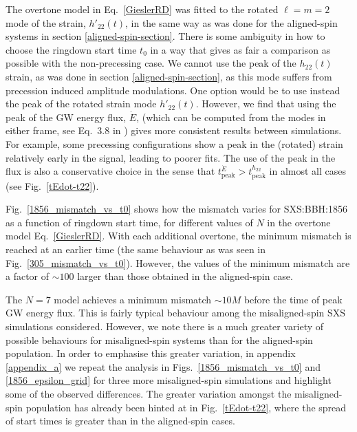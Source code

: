The overtone model in Eq.~\ref{GieslerRD} was fitted to the rotated $\ell=m=2$ mode of the strain, $h'_{22}(t)$, in the same way as was done for the aligned-spin systems in section \ref{aligned-spin-section}.
There is some ambiguity in how to choose the ringdown start time $t_0$ in a way that gives as fair a comparison as possible with the non-precessing case.
We cannot use the peak of the $h_{22}(t)$ strain, as was done in section \ref{aligned-spin-section}, as this mode suffers from precession induced amplitude modulations. 
One option would be to use instead the peak of the rotated strain mode $h'_{22}(t)$.
However, we find that using the peak of the GW energy flux, $\dot{E}$, (which can be computed from the modes in either frame, see Eq.~3.8 in \cite{Ruiz:2007yx}) gives more consistent results between simulations. For example, some precessing configurations show a peak in the (rotated) strain relatively early in the signal, leading to poorer fits.
The use of the peak in the flux is also a conservative choice in the sense that $t_{\mathrm{peak}}^{\dot{E}} > t_{\mathrm{peak}}^{h_{22}}$ in almost all cases (see Fig.~\ref{tEdot-t22}).

Fig.~\ref{1856_mismatch_vs_t0} shows how the mismatch varies for SXS:BBH:1856 as a function of ringdown start time, for different values of $N$ in the overtone model Eq.~\ref{GieslerRD}.
With each additional overtone, the minimum mismatch is reached at an earlier time (the same behaviour as was seen in Fig.~\ref{305_mismatch_vs_t0}).
However, the values of the minimum mismatch are a factor of $\sim 100$ larger than those obtained in the aligned-spin case. 

The $N=7$ model achieves a minimum mismatch $\sim 10M$ before the time of peak GW energy flux. This is fairly typical behaviour among the misaligned-spin SXS simulations considered.
However, we note there is a much greater variety of possible behaviours for misaligned-spin systems than for the aligned-spin population. 
In order to emphasise this greater variation, in appendix \ref{appendix_a} we repeat the analysis in Figs.~\ref{1856_mismatch_vs_t0} and \ref{1856_epsilon_grid} for three more misaligned-spin simulations and highlight some of the observed differences. 
The greater variation amongst the misaligned-spin population has already been hinted at in Fig.~\ref{tEdot-t22}, where the spread of start times is greater than in the aligned-spin cases.

